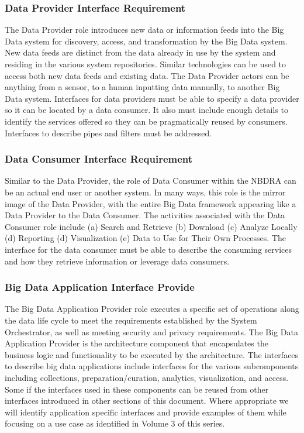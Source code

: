 \documentclass[10pt]{article}
\begin{document}
\subsubsection{Data Provider Interface Requirement}

The Data Provider role introduces new data or information feeds into the Big Data system for discovery, access, and transformation by the Big Data system. New data feeds are distinct from the data already in use by the system and residing in the various system repositories. Similar technologies can be used to access both new data feeds and existing data. The Data Provider actors can be anything from a sensor, to a human inputting data manually, to another Big Data system.
Interfaces for data providers must be able to specify a data provider so it can be located by a data consumer. It also must include enough details to identify the services offered so they can be pragmatically reused by consumers. Interfaces to describe pipes and filters must be addressed.

\subsubsection{Data Consumer Interface Requirement}

Similar to the Data Provider, the role of Data Consumer within the NBDRA can be an actual end user or another system. In many ways, this role is the mirror image of the Data Provider, with the entire Big Data framework appearing like a Data Provider to the Data Consumer. The activities associated with the Data Consumer role include (a) Search and Retrieve (b) Download (c) Analyze Locally (d) Reporting (d) Visualization (e) Data to Use for Their Own Processes. The interface for the data consumer must be able to describe the consuming services and how they retrieve information or leverage data consumers.

\subsubsection{Big Data Application Interface Provide}

The Big Data Application Provider role executes a specific set of operations along the data life cycle to meet the requirements established by the System Orchestrator, as well as meeting security and privacy requirements. The Big Data Application Provider is the architecture component that encapsulates the business logic and functionality to be executed by the architecture. 
The interfaces to describe big data applications include interfaces for the various subcomponents including collections, preparation/curation, analytics, visualization, and access. Some if the interfaces used in these components can be reused from other interfaces introduced in other sections of this document. Where appropriate we will identify application specific interfaces and provide examples of them while focusing on a use case as identified in Volume 3 of this series.
\end{document}
